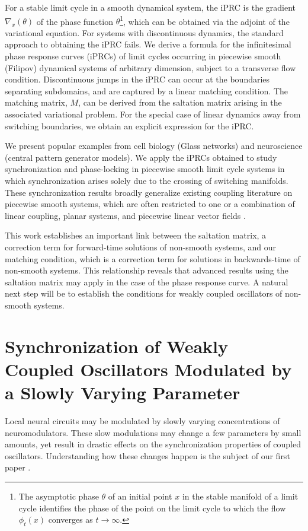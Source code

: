 \documentclass[a4paper,11pt]{article}
\begin{document}
For a stable limit cycle in a smooth dynamical system, the iPRC is the gradient $\nabla_x(\theta)$ of the phase function $\theta$\footnote{The asymptotic phase $\theta$ of an initial point $x$ in the stable manifold of a limit cycle identifies the phase of the point on the limit cycle to which the flow $\phi_t(x)$ converges as $t\rightarrow\infty$.}, which can be obtained via the adjoint of the variational equation. For systems with discontinuous dynamics, the standard approach to obtaining the iPRC fails. We derive a formula for the infinitesimal phase response curves (iPRCs) of limit cycles occurring in piecewise smooth (Filipov) dynamical systems of arbitrary dimension, subject to a transverse flow condition. Discontinuous jumps in the iPRC can occur at the boundaries separating subdomains, and are captured by a linear matching condition. The matching matrix, $M$, can be derived from the saltation matrix arising in the associated variational problem. For the special case of linear dynamics away from switching boundaries, we obtain an explicit expression for the iPRC.


We present popular examples from cell biology (Glass networks) and neuroscience (central pattern generator models). We apply the iPRCs obtained to study synchronization and phase-locking in piecewise smooth limit cycle systems in which synchronization arises solely due to the crossing of switching manifolds. These synchronization results broadly generalize existing coupling literature on piecewise smooth systems, which are often restricted to one or a combination of linear coupling, planar systems, and piecewise linear vector fields \cite{coombes2016synchrony,izhikevich2000phase,coombes2012nonsmooth}.


This work establishes an important link between the saltation matrix, a correction term for forward-time solutions of non-smooth systems, and our matching condition, which is a correction term for solutions in backwards-time of non-smooth systems. This relationship reveals that advanced results using the saltation matrix may apply in the case of the phase response curve. A natural next step will be to establish the conditions for weakly coupled oscillators of non-smooth systems.


\section{Synchronization of Weakly Coupled Oscillators Modulated by a Slowly Varying Parameter}
Local neural circuits may be modulated by slowly varying concentrations of neuromodulators. These slow modulations may change a few parameters by small amounts, yet result in drastic effects on the synchronization properties of coupled oscillators. Understanding how these changes happen is the subject of our first paper \cite{park2016weakly}.
\end{document}

